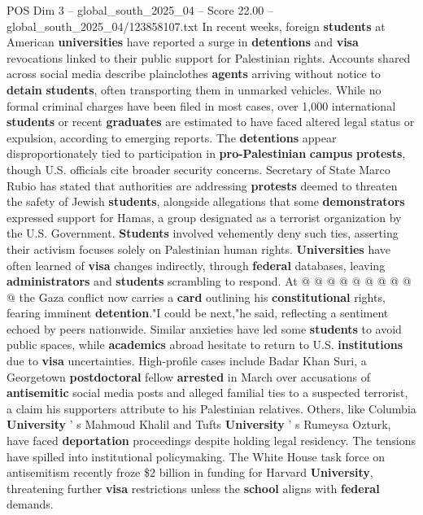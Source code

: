 \begin{textsample}{POS Dim 3 – global\_south\_2025\_04 – Score 22.00 – global\_south\_2025\_04/123858107.txt}  \label{ex:f3_pos_117}
In recent weeks, foreign \textbf{students} at American \textbf{universities} have reported a surge in \textbf{detentions} and \textbf{visa} revocations linked to their public support for Palestinian rights.
Accounts shared across social media describe plainclothes \textbf{agents} arriving without notice to \textbf{detain} \textbf{students}, often transporting them in unmarked vehicles.
While no formal criminal charges have been filed in most cases, over 1,000 international \textbf{students} or recent \textbf{graduates} are estimated to have faced altered legal status or expulsion, according to emerging reports.
The \textbf{detentions} appear disproportionately tied to participation in \textbf{pro-Palestinian} \textbf{campus} \textbf{protests}, though U.S. officials cite broader security concerns.
Secretary of State Marco Rubio has stated that authorities are addressing \textbf{protests} deemed to threaten the safety of Jewish \textbf{students}, alongside allegations that some \textbf{demonstrators} expressed support for Hamas, a group designated as a terrorist organization by the U.S.
Government. \textbf{Students} involved vehemently deny such ties, asserting their activism focuses solely on Palestinian human rights. \textbf{Universities} have often learned of \textbf{visa} changes indirectly, through \textbf{federal} databases, leaving \textbf{administrators} and \textbf{students} scrambling to respond.
At @ @ @ @ @ @ @ @ @ @ the Gaza conflict now carries a \textbf{card} outlining his \textbf{constitutional} rights, fearing imminent \textbf{detention}."I could be next,"he said, reflecting a sentiment echoed by peers nationwide.
Similar anxieties have led some \textbf{students} to avoid public spaces, while \textbf{academics} abroad hesitate to return to U.S. \textbf{institutions} due to \textbf{visa} uncertainties.
High-profile cases include Badar Khan Suri, a Georgetown \textbf{postdoctoral} fellow \textbf{arrested} in March over accusations of \textbf{antisemitic} social media posts and alleged familial ties to a suspected terrorist, a claim his supporters attribute to his Palestinian relatives.
Others, like Columbia \textbf{University} ' s Mahmoud Khalil and Tufts \textbf{University} ' s Rumeysa Ozturk, have faced \textbf{deportation} proceedings despite holding legal residency.
The tensions have spilled into institutional policymaking.
The White House task force on antisemitism recently froze \$2 billion in funding for Harvard \textbf{University}, threatening further \textbf{visa} restrictions unless the \textbf{school} aligns with \textbf{federal} demands.

\end{textsample}
